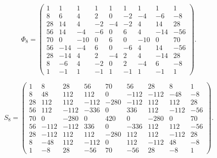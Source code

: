 \begingroup
\small
\setlength{\arraycolsep}{3pt}
\[
\Phi_{8}=\begin{pmatrix}
1 & 1 & 1 & 1 & 1 & 1 & 1 & 1 & 1 \\
8 & 6 & 4 & 2 & 0 & -2 & -4 & -6 & -8 \\
28 & 14 & 4 & -2 & -4 & -2 & 4 & 14 & 28 \\
56 & 14 & -4 & -6 & 0 & 6 & 4 & -14 & -56 \\
70 & 0 & -10 & 0 & 6 & 0 & -10 & 0 & 70 \\
56 & -14 & -4 & 6 & 0 & -6 & 4 & 14 & -56 \\
28 & -14 & 4 & 2 & -4 & 2 & 4 & -14 & 28 \\
8 & -6 & 4 & -2 & 0 & 2 & -4 & 6 & -8 \\
1 & -1 & 1 & -1 & 1 & -1 & 1 & -1 & 1
\end{pmatrix}.
\]
\endgroup

\begingroup
\small
\setlength{\arraycolsep}{3pt}
\[
S_{8}=\begin{pmatrix}
1 & 8 & 28 & 56 & 70 & 56 & 28 & 8 & 1 \\
8 & 48 & 112 & 112 & 0 & -112 & -112 & -48 & -8 \\
28 & 112 & 112 & -112 & -280 & -112 & 112 & 112 & 28 \\
56 & 112 & -112 & -336 & 0 & 336 & 112 & -112 & -56 \\
70 & 0 & -280 & 0 & 420 & 0 & -280 & 0 & 70 \\
56 & -112 & -112 & 336 & 0 & -336 & 112 & 112 & -56 \\
28 & -112 & 112 & 112 & -280 & 112 & 112 & -112 & 28 \\
8 & -48 & 112 & -112 & 0 & 112 & -112 & 48 & -8 \\
1 & -8 & 28 & -56 & 70 & -56 & 28 & -8 & 1
\end{pmatrix}.
\]
\endgroup

